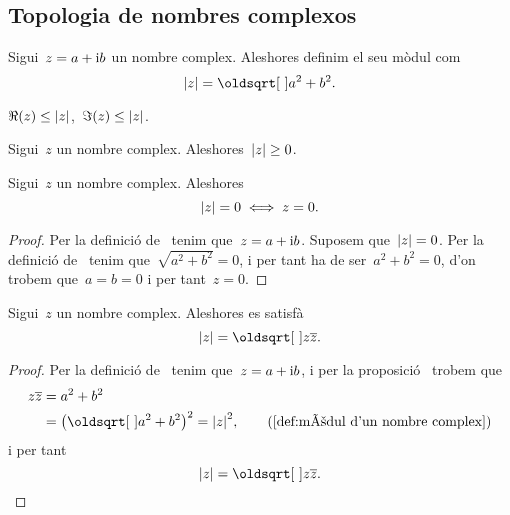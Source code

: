 \documentclass[../Apunts.tex]{subfiles}
\begin{document}
	\subsection{Topologia de nombres complexos}
	\begin{definition}
		\label{def:mòdul d'un nombre complex}
		Sigui~\(z=a+\mathrm{i} b\) un nombre complex. Aleshores definim el seu mòdul com
		\[\modul{z}=\sqrt{a^{2}+b^{2}}.\]
	\end{definition}
	\begin{observation}
		\label{obs:les parts real i imaginàries d'un complex són menors que el seu mòdul}
		\label{obs:la part real d'un complex és menor que el seu mòdul}
		\label{obs:la part imaginària d'un complex és menor que el seu mòdul}
		\(\Re(z)\leq\modul{z}\),~\(\Im(z)\leq\modul{z}\).
	\end{observation}
	\begin{observation}
		\label{prop:el mòdul d'un nombre complex és no negatiu}
		Sigui~\(z\) un nombre complex. Aleshores~\(\modul{z}\geq0\).
	\end{observation}
	\begin{proposition}
		\label{prop:el mòdul d'un nombre complex és zero si i només si aquest és zero}
		Sigui~\(z\) un nombre complex. Aleshores
		\[\modul{z}=0\sii z=0.\]
	\end{proposition}
	\begin{proof}
		Per la definició de~ tenim que~\(z=a+\mathrm{i} b\). Suposem que~\(\modul{z}=0\). Per la definició de~ tenim que~\(\sqrt{a^{2}+b^{2}}=0\), i per tant ha de ser~\(a^{2}+b^{2}=0\), d'on trobem que~\(a=b=0\) i per tant~\(z=0\).
	\end{proof}
	\begin{proposition}
		\label{prop:el mòdul d'un nombre complex és l'arrel del nombre pel seu conjugat}
		Sigui~\(z\) un nombre complex. Aleshores es satisfà
		\[\modul{z}=\sqrt{z\conjugat{z}}.\]
	\end{proposition}
	\begin{proof}
		Per la definició de~ tenim que~\(z=a+\mathrm{i} b\), i per la proposició~ trobem que
		\begin{align*}
			z\conjugat{z}&=a^{2}+b^{2} \\
			&=\big(\sqrt{a^{2}+b^{2}}\big)^{2}=\modul{z}^{2}, \tag{\ref{def:mòdul d'un nombre complex}}
		\end{align*}
		i per tant 
		\[\modul{z}=\sqrt{z\conjugat{z}}.\qedhere\]
	\end{proof}
\end{document}
